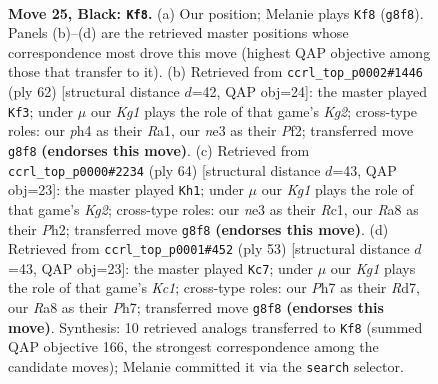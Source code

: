 \documentclass[11pt]{article}
\begin{document}
\clearpage

\begin{figure}[p]\centering
\begin{subfigure}{0.46\textwidth}\centering
\resizebox{\linewidth}{!}{%
\newchessgame
\chessboard[
  setfen={rn4k1/p4ppp/4p3/6R1/7P/4Nb2/PP6/R1K5 b - - 1 25},
  showmover=false,
  pgfstyle=straightmove, color=movearrow, markmove={g8-f8}
]}
\caption{}
\end{subfigure}\hfill
\begin{subfigure}{0.46\textwidth}\centering
\resizebox{\linewidth}{!}{%
\newchessgame
\chessboard[
  setfen={r5k1/1p4p1/2n1pp2/7p/P6P/2B1P1P1/5PK1/R7 w - - 0 32},
  showmover=false,
  pgfstyle=straightmove, color=movearrow, markmove={g2-f3}
]}
\caption{}
\end{subfigure}
\\[4pt]
\begin{subfigure}{0.46\textwidth}\centering
\resizebox{\linewidth}{!}{%
\newchessgame
\chessboard[
  setfen={5r1k/pp4p1/7p/3RPr2/1P6/P3P3/6KP/2R5 w - - 2 33},
  showmover=false,
  pgfstyle=straightmove, color=movearrow, markmove={g2-h1}
]}
\caption{}
\end{subfigure}\hfill
\begin{subfigure}{0.46\textwidth}\centering
\resizebox{\linewidth}{!}{%
\newchessgame
\chessboard[
  setfen={2k5/p2r2pp/1p6/2pb4/7P/P7/3R2P1/2K1R3 b - - 3 27},
  showmover=false,
  pgfstyle=straightmove, color=movearrow, markmove={c8-c7}
]}
\caption{}
\end{subfigure}
\caption{\textbf{Move 25, Black: \texttt{Kf8}.} (a) Our position; Melanie plays \texttt{Kf8} (\texttt{g8f8}). Panels (b)--(d) are the retrieved master positions whose correspondence most drove this move (highest QAP objective among those that transfer to it). (b) Retrieved from \texttt{ccrl\_top\_p0002\#1446} (ply 62) [structural distance $d$=42, QAP obj=24]: the master played \texttt{Kf3}; under $\mu$ our \emph{Kg1} plays the role of that game's \emph{Kg2}; cross-type roles: our \emph{p}h4 as their \emph{R}a1, our \emph{n}e3 as their \emph{P}f2; transferred move \texttt{g8f8} \textbf{(endorses this move)}. (c) Retrieved from \texttt{ccrl\_top\_p0000\#2234} (ply 64) [structural distance $d$=43, QAP obj=23]: the master played \texttt{Kh1}; under $\mu$ our \emph{Kg1} plays the role of that game's \emph{Kg2}; cross-type roles: our \emph{n}e3 as their \emph{R}c1, our \emph{R}a8 as their \emph{P}h2; transferred move \texttt{g8f8} \textbf{(endorses this move)}. (d) Retrieved from \texttt{ccrl\_top\_p0001\#452} (ply 53) [structural distance $d$=43, QAP obj=23]: the master played \texttt{Kc7}; under $\mu$ our \emph{Kg1} plays the role of that game's \emph{Kc1}; cross-type roles: our \emph{P}h7 as their \emph{R}d7, our \emph{R}a8 as their \emph{P}h7; transferred move \texttt{g8f8} \textbf{(endorses this move)}. Synthesis: 10 retrieved analogs transferred to \texttt{Kf8} (summed QAP objective 166, the strongest correspondence among the candidate moves); Melanie committed it via the \texttt{search} selector.}
\label{fig:thought-m49}
\end{figure}
\end{document}

